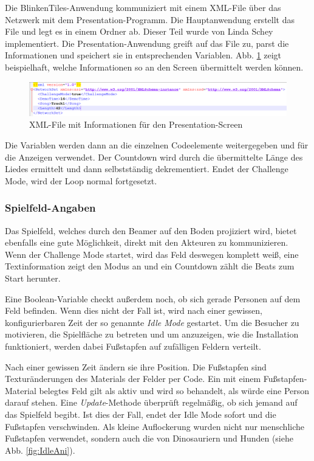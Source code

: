 Die BlinkenTiles-Anwendung kommuniziert mit einem XML-File über das Netzwerk mit dem Presentation-Programm. Die Hauptanwendung erstellt das File und legt es in einem Ordner ab. Dieser Teil wurde von Linda Schey implementiert. Die Presentation-Anwendung greift auf das File zu, parst die Informationen und speichert sie in entsprechenden Variablen. Abb. \ref{fig:XML} zeigt beispielhaft, welche Informationen so an den Screen übermittelt werden können.

\begin{figure}[htbp]
	\centering
		\includegraphics[width=1.0\textwidth]{images/XML.png}
	\caption{XML-File mit Informationen für den Presentation-Screen }
	\label{fig:XML}
\end{figure}

Die Variablen werden dann an die einzelnen Codeelemente weitergegeben und für die Anzeigen verwendet. Der Countdown wird durch die übermittelte Länge des Liedes ermittelt und dann selbstständig dekrementiert. Endet der Challenge Mode, wird der Loop normal fortgesetzt.

\subsubsection{Spielfeld-Angaben}
Das Spielfeld, welches durch den Beamer auf den Boden projiziert wird, bietet ebenfalls eine gute Möglichkeit, direkt mit den Akteuren zu kommunizieren. Wenn der Challenge Mode startet, wird das Feld deswegen komplett weiß, eine Textinformation zeigt den Modus an und ein Countdown zählt die Beats zum Start herunter.

Eine Boolean-Variable checkt außerdem noch, ob sich gerade Personen auf dem Feld befinden. Wenn dies nicht der Fall ist, wird nach einer gewissen, konfigurierbaren Zeit der so genannte \textit{Idle Mode} gestartet. Um die Besucher zu motivieren, die Spielfläche zu betreten und um anzuzeigen, wie die Installation funktioniert, werden dabei Fußstapfen auf zufälligen Feldern verteilt.

Nach einer gewissen Zeit ändern sie ihre Position. Die Fußstapfen sind Texturänderungen des Materials der Felder per Code. Ein mit einem Fußstapfen-Material belegtes Feld gilt als aktiv und wird so behandelt, als würde eine Person darauf stehen. Eine \emph{Update}-Methode überprüft regelmäßig, ob sich jemand auf das Spielfeld begibt. Ist dies der Fall, endet der Idle Mode sofort und die Fußstapfen verschwinden. Als kleine Auflockerung wurden nicht nur menschliche Fußstapfen verwendet, sondern auch die von Dinosauriern und Hunden (siehe Abb. \ref{fig:IdleAni}).

